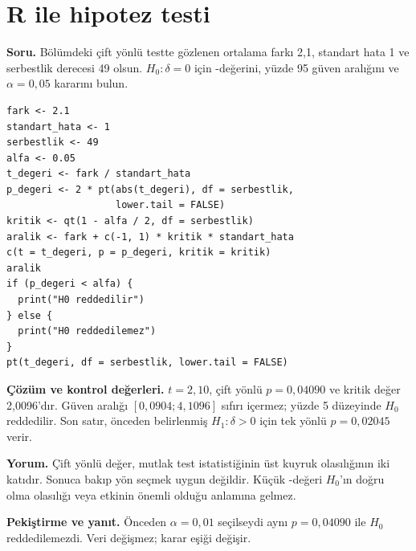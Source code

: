 \section{R ile hipotez testi}
\label{sec:r-b09}

\textbf{Soru.} Bölümdeki çift yönlü testte gözlenen ortalama farkı 2,1,
standart hata 1 ve serbestlik derecesi 49 olsun. $H_0:\delta=0$ için
\pval-değerini, yüzde 95 güven aralığını ve $\alpha=0{,}05$ kararını bulun.

\begin{lstlisting}[style=prismR]
fark <- 2.1
standart_hata <- 1
serbestlik <- 49
alfa <- 0.05
t_degeri <- fark / standart_hata
p_degeri <- 2 * pt(abs(t_degeri), df = serbestlik,
                   lower.tail = FALSE)
kritik <- qt(1 - alfa / 2, df = serbestlik)
aralik <- fark + c(-1, 1) * kritik * standart_hata
c(t = t_degeri, p = p_degeri, kritik = kritik)
aralik
if (p_degeri < alfa) {
  print("H0 reddedilir")
} else {
  print("H0 reddedilemez")
}
pt(t_degeri, df = serbestlik, lower.tail = FALSE)
\end{lstlisting}

\begin{outputguidebox}
\textbf{Çözüm ve kontrol değerleri.} $t=2{,}10$, çift yönlü
$p=0{,}04090$ ve kritik değer 2,0096'dır. Güven aralığı
$[0{,}0904;4{,}1096]$ sıfırı içermez; yüzde 5 düzeyinde $H_0$ reddedilir.
Son satır, önceden belirlenmiş $H_1:\delta>0$ için tek yönlü
$p=0{,}02045$ verir.
\end{outputguidebox}

\textbf{Yorum.} Çift yönlü değer, mutlak test istatistiğinin üst kuyruk
olasılığının iki katıdır. Sonuca bakıp yön seçmek uygun değildir. Küçük
\pval-değeri $H_0$'ın doğru olma olasılığı veya etkinin önemli olduğu anlamına gelmez.

\textbf{Pekiştirme ve yanıt.} Önceden $\alpha=0{,}01$ seçilseydi aynı
$p=0{,}04090$ ile $H_0$ reddedilemezdi. Veri değişmez; karar eşiği değişir.